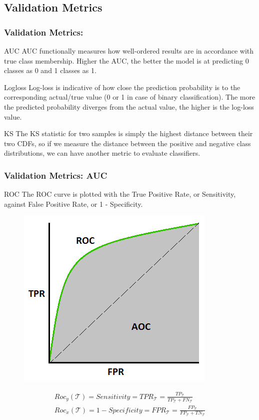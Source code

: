 \documentclass{beamer}
\begin{document}
\subsection{Validation Metrics}
\begin{frame}
\frametitle{Validation Metrics:}
\begin{block}{AUC}
AUC functionally measures how well-ordered results are in accordance with true class membership. Higher the AUC, the better the model is at predicting 0 classes as 0 and 1 classes as 1.
\end{block}
\begin{block}{Logloss}
Log-loss is indicative of how close the prediction probability is to the corresponding actual/true value (0 or 1 in case of binary classification). The more the predicted probability diverges from the actual value, the higher is the log-loss value.
\end{block}
\begin{block}{KS}
The KS statistic for two samples is simply the highest distance between their two CDFs, so if we measure the distance between the positive and negative class distributions, we can have another metric to evaluate classifiers.
\end{block}
\end{frame}
\begin{frame}
\frametitle{Validation Metrics: AUC}
\begin{block}{ROC}
The ROC curve is plotted with the True Positive Rate, or Sensitivity, against False Positive Rate, or 1 - Specificity.

\end{block}
\begin{figure}[h]
 \centering
 \includegraphics[scale=0.25]{rock.png}
\end{figure}
\begin{gather*}
    Roc_{y}(\mathcal{T}) =Sensitivity= TPR_{\mathcal{T}} = \frac{TP_{\mathcal{T}}}{TP_{\mathcal{T}} + FN_{\mathcal{T}}} \\
    Roc_{x}(\mathcal{T}) =1 - Specificity= FPR_{\mathcal{T}} = \frac{FP_{\mathcal{T}}}{FP_{\mathcal{T}} + TN_{\mathcal{T}}}
\end{gather*}
\end{frame}
\end{document}
